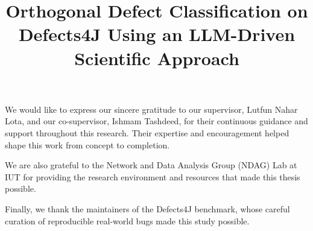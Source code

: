 \documentclass{iutbscthesis}
\title{Orthogonal Defect Classification on Defects4J Using an LLM-Driven Scientific Approach}
\begin{document}

\coverpage
{}
\titlepage
\declarationofcandidate


\tableofcontents
\listoffigures
\listoftables

\clearpage

\begin{abbreviations}
\end{abbreviations}

\begin{acknowledgement}
We would like to express our sincere gratitude to our supervisor, Lutfun Nahar Lota, and our co-supervisor, Ishmam Tashdeed, for their continuous guidance and support throughout this research. Their expertise and encouragement helped shape this work from concept to completion.

We are also grateful to the Network and Data Analysis Group (NDAG) Lab at IUT for providing the research environment and resources that made this thesis possible.

Finally, we thank the maintainers of the Defects4J benchmark, whose careful curation of reproducible real-world bugs made this study possible.
\end{acknowledgement}
\end{document}
